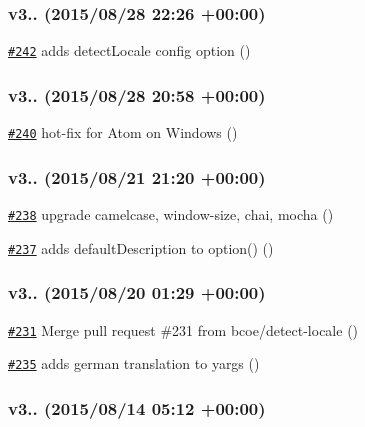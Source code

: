 \subsubsection*{v3.. (2015/08/28 22\+:26 +00\+:00)}


\begin{DoxyItemize}
\item \href{https://github.com/bcoe/yargs/pull/242}{\tt \#242} adds detect\+Locale config option ()
\end{DoxyItemize}

\subsubsection*{v3.. (2015/08/28 20\+:58 +00\+:00)}


\begin{DoxyItemize}
\item \href{https://github.com/bcoe/yargs/pull/240}{\tt \#240} hot-\/fix for Atom on Windows ()
\end{DoxyItemize}

\subsubsection*{v3.. (2015/08/21 21\+:20 +00\+:00)}


\begin{DoxyItemize}
\item \href{https://github.com/bcoe/yargs/pull/238}{\tt \#238} upgrade camelcase, window-\/size, chai, mocha ()
\item \href{https://github.com/bcoe/yargs/pull/237}{\tt \#237} adds default\+Description to option() ()
\end{DoxyItemize}

\subsubsection*{v3.. (2015/08/20 01\+:29 +00\+:00)}


\begin{DoxyItemize}
\item \href{https://github.com/bcoe/yargs/pull/231}{\tt \#231} Merge pull request \#231 from bcoe/detect-\/locale ()
\item \href{https://github.com/bcoe/yargs/pull/235}{\tt \#235} adds german translation to yargs ()
\end{DoxyItemize}

\subsubsection*{v3.. (2015/08/14 05\+:12 +00\+:00)}


